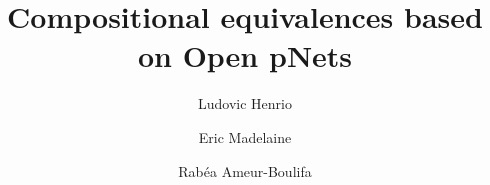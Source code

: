 \documentclass{lmcs}
\begin{document}
\title{Compositional equivalences based on Open pNets
}
\author{Ludovic Henrio}
\address{Univ Lyon, EnsL, UCBL, CNRS, Inria,  LIP, F-69342, LYON Cedex 07, France.}

\author{Eric Madelaine}
\address{INRIA Sophia Antipolis M\'edit\'erann\'ee, UCA, BP 93, 06902 Sophia Antipolis, France}
\author{Rab\'ea Ameur-Boulifa}

\end{document}
